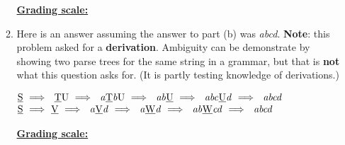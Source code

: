 \documentclass[11pt,fleqn]{article}
\begin{document}
\begin{enumerate}
\begin{enumerate}
\begin{info}{\textbf{\underline{Grading scale:}}}
                  \end{info}

            \item Here is an answer assuming the answer to part (b) was
                  \emph{abcd}.  \textbf{Note}: this problem asked for a
                  \textbf{derivation}.  Ambiguity can be demonstrate by
                  showing two parse trees for the same string in a
                  grammar, but that is \textbf{not} what this question asks
                  for.  (It is partly testing knowledge of derivations.)

                  \begin{center}

                    \renewcommand{\arraystretch}{2}

                    \(
                      \begin{array}[t]{@{}l}
                      \mathrm{\underline{S} \
                              \Longrightarrow\ \
                              \underline{T}U \
                              \Longrightarrow\ \
                              \mathit{a}\underline{T}\mathit{b}U \
                              \Longrightarrow\ \
                              \mathit{ab}\underline{U} \
                              \Longrightarrow\ \
                              \mathit{abc}\underline{U}\mathit{d} \
                              \Longrightarrow\ \
                              \mathit{abcd}}
                        \\
                      \mathrm{\underline{S} \
                              \Longrightarrow\ \underline{V} \
                              \Longrightarrow\ \
                              \mathit{a}\underline{V}\mathit{d} \
                              \Longrightarrow\ \
                              \mathit{a}\underline{W}\mathit{d} \
                              \Longrightarrow\ \
                              \mathit{ab}\underline{W}\mathit{cd} \
                              \Longrightarrow\ \
                              \mathit{abcd}}
                        \\
                      \end{array}
                    \)

                  \end{center}

                  \begin{info}{\textbf{\underline{Grading scale:}}}

                    \begin{itemize}


\end{itemize}
\end{info}
\end{enumerate}
\end{enumerate}
\end{document}
